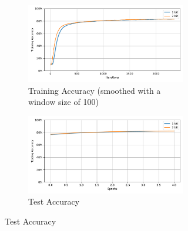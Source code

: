         \begin{figure}[H]
            \centering
            \begin{subfigure}[H]{0.89\textwidth}
                \centering
                \begin{subfigure}[H]{\textwidth}
                    \includegraphics[width=\textwidth]{../timesteps/FashionMNIST/plots/fashionmnist_train_acc.pdf}
                    \caption{Training Accuracy (smoothed with a window size of 100)}
                \end{subfigure}
                \hfill
                \begin{subfigure}[H]{\textwidth}
                    \includegraphics[width=\textwidth]{../timesteps/FashionMNIST/plots/fashionmnist_test_acc.pdf}
                    \caption{Test Accuracy}
                \end{subfigure}
            \end{subfigure}
            \hfill
            \begin{subfigure}[H]{0.1\textwidth}

\end{subfigure}
\end{figure}
